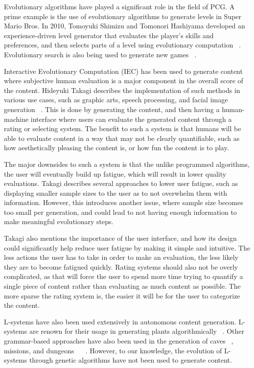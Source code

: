 \documentclass[letterpaper, 10 pt, conference]{ieeeconf}
\begin{document}
\par
Evolutionary algorithms have played a significant role in the field of PCG. A prime example is the use of evolutionary algorithms to generate levels in Super Mario Bros. In 2010, Tomoyuki Shimizu and Tomonori Hashiyama developed an experience-driven level generator that evaluates the player's skills and preferences, and then selects parts of a level using evolutionary computation ~\cite{togelius2010level}. Evolutionary search is also being used to generate new games ~\cite{browne2010evolutionary}. 
\par
Interactive Evolutionary Computation (IEC) has been used to generate content where subjective human evaluation is a major component in the overall score of the content. Hideyuki Takagi describes the implementation of such methods in various use cases, such as graphic arts, speech processing, and facial image generation ~\cite{IEC}. This is done by generating the content, and then having a human-machine interface where users can evaluate the generated content through a rating or selecting system. The benefit to such a system is that humans will be able to evaluate content in a way that may not be clearly quantifiable, such as how aesthetically pleasing the content is, or how fun the content is to play. 
\par
The major downsides to such a system is that the unlike programmed algorithms, the user will eventually build up fatigue, which will result in lower quality evaluations. Takagi describes several approaches to lower user fatigue, such as displaying smaller sample sizes to the user as to not overwhelm them with information. However, this introduces another issue, where sample size becomes too small per generation, and could lead to not having enough information to make meaningful evolutionary steps.
\par
Takagi also mentions the importance of the user interface, and how its design could significantly help reduce user fatigue by making it simple and intuitive. The less actions the user has to take in order to make an evaluation, the less likely they are to become fatigued quickly. Rating systems should also not be overly complicated, as that will force the user to spend more time trying to quantify a single piece of content rather than evaluating as much content as possible. The more sparse the rating system is, the easier it will be for the user to categorize the content.
\par
L-systems have also been used extensively in autonomous content generation. L-systems are renown for their usage in generating plants algorithmically ~\cite{prus2015beauty}. Other grammar-based approaches have also been used in the generation of caves ~\cite{mark2015procedural}, missions, and dungeons ~\cite{dormans2010adventures} ~\cite{dormans2011generating}. However, to our knowledge, the evolution of L-systems through genetic algorithms have not been used to generate content. 
\end{document}

